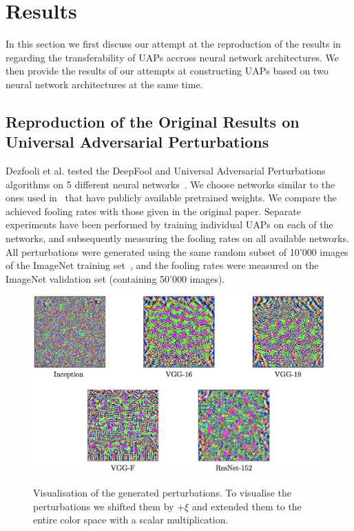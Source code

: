 \documentclass[runningheads]{llncs}
\begin{document}
\section{Results}
In this section we first discuss our attempt at the reproduction of the results in~\cite{moosavidezfooli_universal_2017} regarding the transferability of UAPs accross neural network architectures. We then provide the results of our attempts at constructing UAPs based on two neural network architectures at the same time.

\subsection{Reproduction of the Original Results on Universal Adversarial Perturbations}
Dezfooli et al. tested the DeepFool and Universal Adversarial Perturbations algorithms on 5 different neural networks~\cite{moosavidezfooli_universal_2017}. We choose networks similar to the ones used in~\cite{moosavidezfooli_universal_2017} that have publicly available pretrained weights. We compare the achieved fooling rates with those given in the original paper. Separate experiments have been performed by training individual UAPs on each of the networks, and subsequently measuring the fooling rates on all available networks. All perturbations were generated using the same random subset of 10'000 images of the ImageNet training set~\cite{imagenet_cvpr09}, and the fooling rates were measured on the ImageNet validation set (containing 50'000 images).

\begin{figure}[h]\label{fig:UAPs}
	\centering
		\includegraphics[width=1.0\textwidth]{images/own_perturbations.png}
	\label{fig_stoerwerte}
	\caption{Visualisation of the generated perturbations. To visualise the perturbations we shifted them by $+\xi$ and extended them to the entire color space with a scalar multiplication.}
\end{figure}
\end{document}

